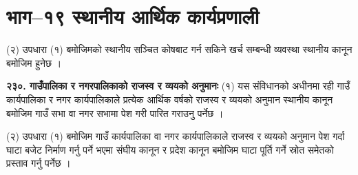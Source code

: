 \section{भाग–१९ स्थानीय आर्थिक कार्यप्रणाली}

(२) उपधारा (१) बमोजिमको स्थानीय सञ्चित कोषबाट गर्न सकिने खर्च सम्बन्धी व्यवस्था स्थानीय कानून बमोजिम हुनेछ ।

\textbf{२३०. गाउँपालिका र नगरपालिकाको राजस्व र व्ययको अनुमानः} (१) यस संविधानको अधीनमा रही गाउँ कार्यपालिका र नगर कार्यपालिकाले प्रत्येक आर्थिक वर्षको राजस्व र व्ययको अनुमान स्थानीय कानून बमोजिम गाउँ सभा वा नगर सभामा पेश गरी पारित गराउनु पर्नेछ ।

(२) उपधारा (१) बमोजिम गाउँ कार्यपालिका वा नगर कार्यपालिकाले राजस्व र व्ययको अनुमान पेश गर्दा घाटा बजेट निर्माण गर्नु पर्ने भएमा
संघीय कानून र प्रदेश कानून बमोजिम घाटा पूर्ति गर्ने स्रोत समेतको प्रस्ताव गर्नु पर्नेछ ।